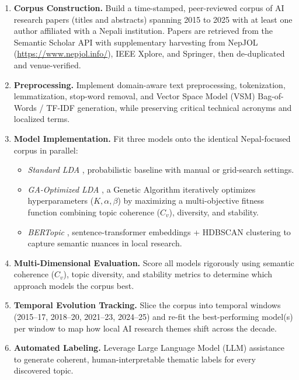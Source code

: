 \documentclass[11pt,a4paper]{article}
\begin{document}
\begin{enumerate}
    \item \textbf{Corpus Construction.}
          Build a time-stamped, peer-reviewed corpus of AI research
          papers (titles and abstracts) spanning 2015 to 2025 with at
          least one author affiliated with a Nepali institution.
          Papers are retrieved from the Semantic Scholar API with
          supplementary harvesting from NepJOL
          (\url{https://www.nepjol.info/}), IEEE Xplore, and Springer,
          then de-duplicated and venue-verified.

    \item \textbf{Preprocessing.}
          Implement domain-aware text preprocessing, tokenization,
          lemmatization, stop-word removal, and Vector Space Model
          (VSM) Bag-of-Words / TF-IDF generation, while preserving
          critical technical acronyms and localized terms.

    \item \textbf{Model Implementation.}
          Fit three models onto the identical Nepal-focused corpus in
          parallel:
          \begin{itemize}
              \item \textit{Standard LDA} ,  probabilistic baseline
                    with manual or grid-search settings.
              \item \textit{GA-Optimized LDA} ,  a Genetic Algorithm
                    iteratively optimizes hyperparameters
                    ($K, \alpha, \beta$) by maximizing a multi-objective
                    fitness function combining topic coherence ($C_v$),
                    diversity, and stability.
              \item \textit{BERTopic} ,  sentence-transformer
                    embeddings + HDBSCAN clustering to capture semantic
                    nuances in local research.
          \end{itemize}

    \item \textbf{Multi-Dimensional Evaluation.}
          Score all models rigorously using semantic coherence ($C_v$),
          topic diversity, and stability metrics to determine which
          approach models the corpus best.

    \item \textbf{Temporal Evolution Tracking.}
          Slice the corpus into temporal windows
          (2015--17, 2018--20, 2021--23, 2024--25) and re-fit the
          best-performing model(s) per window to map how local AI
          research themes shift across the decade.

    \item \textbf{Automated Labeling.}
          Leverage Large Language Model (LLM) assistance to generate
          coherent, human-interpretable thematic labels for every
          discovered topic.
\end{enumerate}
\end{document}
